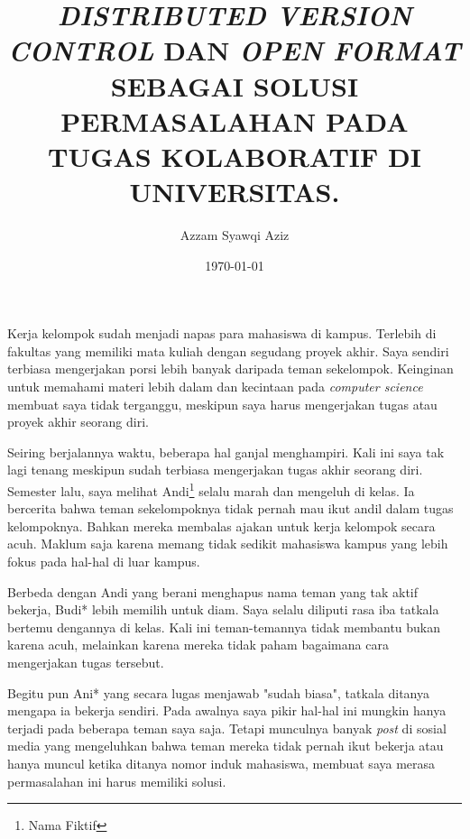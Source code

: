 \documentclass[a4paper,11pt]{article}
\author{Azzam Syawqi Aziz}
\date{\today}
\title{\emph{DISTRIBUTED VERSION CONTROL} DAN \emph{OPEN FORMAT}
  SEBAGAI SOLUSI PERMASALAHAN PADA TUGAS KOLABORATIF DI UNIVERSITAS.}
\begin{document}
\maketitle



Kerja kelompok sudah menjadi napas para mahasiswa di kampus. Terlebih
di fakultas yang memiliki mata kuliah dengan segudang proyek akhir.
Saya sendiri terbiasa mengerjakan porsi lebih banyak daripada teman
sekelompok. Keinginan untuk memahami materi lebih dalam dan kecintaan
pada \emph{computer science} membuat saya tidak terganggu, meskipun
saya harus mengerjakan tugas atau proyek akhir seorang diri.

{
\renewcommand*{\thefootnote}{\fnsymbol{footnote}}

Seiring berjalannya waktu, beberapa hal ganjal menghampiri. Kali ini
saya tak lagi tenang meskipun sudah terbiasa mengerjakan tugas akhir
seorang diri. Semester lalu, saya melihat Andi\footnote[1]{Nama
Fiktif} selalu marah dan mengeluh di kelas. Ia bercerita bahwa teman
sekelompoknya tidak pernah mau ikut andil dalam tugas kelompoknya.
Bahkan mereka membalas ajakan untuk kerja kelompok secara acuh. Maklum
saja karena memang tidak sedikit mahasiswa kampus yang lebih fokus
pada hal-hal di luar kampus.

}

\renewcommand*{\thefootnote}{\arabic{footnote}}
\setcounter{footnote}{0}

Berbeda dengan Andi yang berani menghapus nama teman yang tak aktif
bekerja, Budi* lebih memilih untuk diam. Saya selalu diliputi rasa iba
tatkala bertemu dengannya di kelas. Kali ini teman-temannya tidak
membantu bukan karena acuh, melainkan karena mereka tidak paham
bagaimana cara mengerjakan tugas tersebut.

Begitu pun Ani* yang secara lugas menjawab "sudah biasa", tatkala
ditanya mengapa ia bekerja sendiri. Pada awalnya saya pikir hal-hal
ini mungkin hanya terjadi pada beberapa teman saya saja. Tetapi
munculnya banyak \emph{post} di sosial media yang mengeluhkan bahwa
teman mereka tidak pernah ikut bekerja atau hanya muncul ketika
ditanya nomor induk mahasiswa, membuat saya merasa permasalahan ini
harus memiliki solusi.
\end{document}
